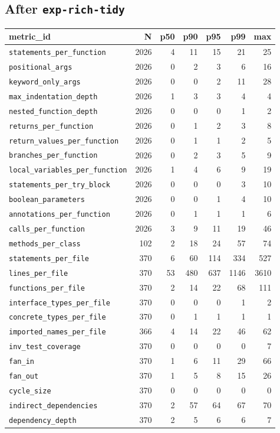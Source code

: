 \documentclass[11pt]{article}
\begin{document}
\subsection{After \texttt{exp-rich-tidy}}
\label{app:kiss-tidy}

{\scriptsize
\begin{longtable}{@{}lrrrrrr@{}}
  \toprule
  metric\_id & N & p50 & p90 & p95 & p99 & max \\
  \midrule
  \endhead
  \texttt{statements\_per\_function} & 2026 & 4 & 11 & 15 & 21 & 25 \\
  \texttt{positional\_args} & 2026 & 0 & 2 & 3 & 6 & 16 \\
  \texttt{keyword\_only\_args} & 2026 & 0 & 0 & 2 & 11 & 28 \\
  \texttt{max\_indentation\_depth} & 2026 & 1 & 3 & 3 & 4 & 4 \\
  \texttt{nested\_function\_depth} & 2026 & 0 & 0 & 0 & 1 & 2 \\
  \texttt{returns\_per\_function} & 2026 & 0 & 1 & 2 & 3 & 8 \\
  \texttt{return\_values\_per\_function} & 2026 & 0 & 1 & 1 & 2 & 5 \\
  \texttt{branches\_per\_function} & 2026 & 0 & 2 & 3 & 5 & 9 \\
  \texttt{local\_variables\_per\_function} & 2026 & 1 & 4 & 6 & 9 & 19 \\
  \texttt{statements\_per\_try\_block} & 2026 & 0 & 0 & 0 & 3 & 10 \\
  \texttt{boolean\_parameters} & 2026 & 0 & 0 & 1 & 4 & 10 \\
  \texttt{annotations\_per\_function} & 2026 & 0 & 1 & 1 & 1 & 6 \\
  \texttt{calls\_per\_function} & 2026 & 3 & 9 & 11 & 19 & 46 \\
  \texttt{methods\_per\_class} & 102 & 2 & 18 & 24 & 57 & 74 \\
  \texttt{statements\_per\_file} & 370 & 6 & 60 & 114 & 334 & 527 \\
  \texttt{lines\_per\_file} & 370 & 53 & 480 & 637 & 1146 & 3610 \\
  \texttt{functions\_per\_file} & 370 & 2 & 14 & 22 & 68 & 111 \\
  \texttt{interface\_types\_per\_file} & 370 & 0 & 0 & 0 & 1 & 2 \\
  \texttt{concrete\_types\_per\_file} & 370 & 0 & 1 & 1 & 1 & 1 \\
  \texttt{imported\_names\_per\_file} & 366 & 4 & 14 & 22 & 46 & 62 \\
  \texttt{inv\_test\_coverage} & 370 & 0 & 0 & 0 & 0 & 7 \\
  \texttt{fan\_in} & 370 & 1 & 6 & 11 & 29 & 66 \\
  \texttt{fan\_out} & 370 & 1 & 5 & 8 & 15 & 26 \\
  \texttt{cycle\_size} & 370 & 0 & 0 & 0 & 0 & 0 \\
  \texttt{indirect\_dependencies} & 370 & 2 & 57 & 64 & 67 & 70 \\
  \texttt{dependency\_depth} & 370 & 2 & 5 & 6 & 6 & 7 \\
  \bottomrule
\end{longtable}
}
\end{document}
